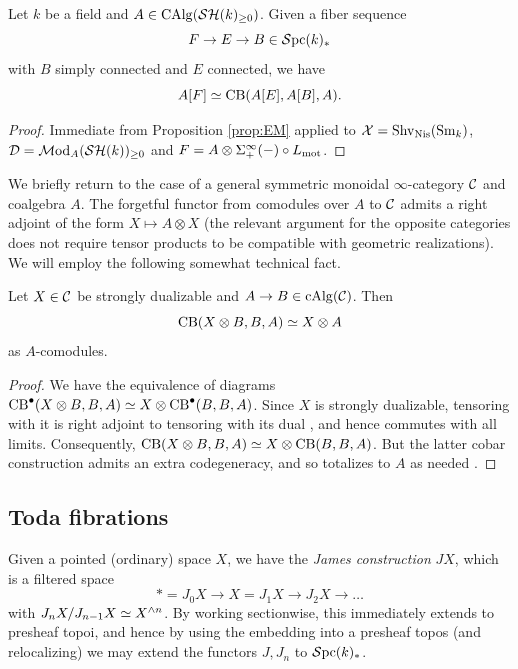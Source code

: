 \documentclass{amsart}
\numberwithin{proposition}{section}
\numberwithin{equation}{section}
\newcommand{\CB}{\mathrm{CB}}
\begin{document}
\begin{corollary} \label{cor:EM}
Let $k$ be a field and $A \in \mathrm{CAlg}(\mathcal{SH}(k)_{\ge 0})$.
Given a fiber sequence \[ F \to E \to B \in \mathcal{S}\mathrm{pc}{}(k)_* \] with $B$ simply connected and $E$ connected, we have \[ A[F] \wequi \CB(A[E], A[B], A). \]
\end{corollary}
\begin{proof}
Immediate from Proposition \ref{prop:EM} applied to $\mathcal X = \mathrm{S}\mathrm{hv}_{\mathrm{Nis}}({\mathrm{S}\mathrm{m}}_k)$, $\mathcal D = \mathcal{M}\mathrm{od}_A(\mathcal{SH}(k))_{\ge 0}$ and $F= A \otimes \Sigma^\infty_+(\mathord-) \circ L_{\mathrm{mot}}$.
\end{proof}

We briefly return to the case of a general symmetric monoidal $\infty$-category $\mathcal C$ and coalgebra $A$.
The forgetful functor from comodules over $A$ to $\mathcal C$ admits a right adjoint of the form $X \mapsto A \otimes X$ (the relevant argument \cite[Corollary~4.2.4.8]{lurie-ha} for the opposite categories does not require tensor products to be compatible with geometric realizations).
We will employ the following somewhat technical fact.
\begin{lemma} \label{lemm:cofree-cotor}
Let $X \in \mathcal C$ be strongly dualizable and $A \to B \in \mathrm{cAlg}(\mathcal C)$.
Then \[ \CB(X \otimes B, B, A) \wequi X \otimes A \] as $A$-comodules.
\end{lemma}
\begin{proof}
We have the equivalence of diagrams $\CB^\bullet(X \otimes B, B, A) \wequi X \otimes \CB^\bullet(B, B, A)$.
Since $X$ is strongly dualizable, tensoring with it is right adjoint to tensoring with its dual \cite[Lemma~4.6.1.6]{lurie-ha}, and hence commutes with all limits. Consequently, $\CB(X \otimes B, B, A) \wequi X \otimes \CB(B,B,A)$.
But the latter cobar construction admits an extra codegeneracy, and so totalizes to $A$ as needed \cite[Remark~4.7.2.3]{lurie-ha}.
\end{proof}


\subsection{Toda fibrations} \label{subsub:toda}
Given a pointed (ordinary) space $X$, we have the \emph{James construction} $JX$, which is a filtered space \[ * = J_0X \to X=J_1 X \to J_2 X \to \dots \] with $J_nX/J_{n-1}X \simeq X^{\wedge n}$.
By working sectionwise, this immediately extends to presheaf topoi, and hence by using the embedding into a presheaf topos (and relocalizing) we may extend the functors $J, J_n$ to $\mathcal{S}\mathrm{pc}{}(k)_*$.
\end{document}
